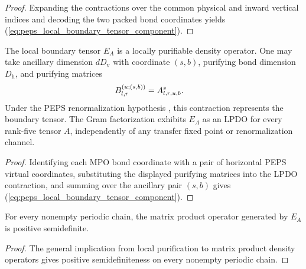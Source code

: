 \begin{proof}
    \leanok
    Expanding the contractions over the common physical and inward vertical
    indices and decoding the two packed bond coordinates yields
    (\ref{eq:peps_local_boundary_tensor_component}).
\end{proof}

\begin{lemma}
    \label{thm:peps_local_boundary_tensor_is_lpdo}
    \leanok
    The local boundary tensor $E_A$ is a locally purifiable density operator.
    One may take ancillary dimension $dD_{\mathrm v}$ with coordinate $(s,b)$,
    purifying bond dimension $D_{\mathrm h}$, and purifying matrices
    \begin{align}
        B^{(u;(s,b))}_{l,r}
         & = A^s_{l,r,u,b}.
        \notag
    \end{align}
    Under the PEPS renormalization hypothesis \cite[lines~716--724]{Cirac2016MPDO_arXiv},
    this contraction represents the boundary tensor. The Gram factorization
    exhibits $E_A$ as an LPDO for every rank-five tensor $A$, independently of
    any transfer fixed point or renormalization channel.
\end{lemma}

\begin{proof}
    \leanok
    Identifying each MPO bond coordinate with a pair of horizontal PEPS virtual
    coordinates, substituting the displayed purifying matrices into the LPDO
    contraction, and summing over the ancillary pair $(s,b)$ gives
    (\ref{eq:peps_local_boundary_tensor_component}).
\end{proof}

\begin{corollary}
    \label{cor:peps_local_boundary_tensor_is_mpdo}
    \leanok
    For every nonempty periodic chain, the matrix product operator generated
    by $E_A$ is positive semidefinite.
\end{corollary}

\begin{proof}
    \leanok
    The general implication from local purification to matrix product
    density operators gives positive semidefiniteness on every nonempty
    periodic chain.
\end{proof}


